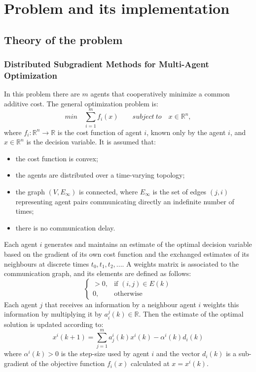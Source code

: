 \documentclass[a4paper,11pt,oneside]{book}
\begin{document}
\chapter{Problem and its implementation} \label{Cap1}

\section{Theory of the problem} \label{Sec1.1}
\subsection {Distributed Subgradient Methods for Multi-Agent Optimization} \label{Subsec1.1.1}
In this problem there are $m$ agents that cooperatively minimize a common additive cost. The general optimization problem is:\\
\begin{equation} \label{costfunct}
min \quad \sum\limits_{i=1}^{m} f_{i} \left( x \right) \qquad subject \ to \quad x \in \mathbb{R}^n,
\end{equation}
where $f_i : \mathbb{R}^n \longrightarrow \mathbb{R}$ is the cost function of agent $i$, known only by the agent $i$, and $x \in \mathbb{R}^n$ is the decision variable. It is assumed that:
\begin{itemize} 
\item the cost function is convex;
\item the agents are distributed over a time-varying topology;
\item the graph $\left(V,E_\infty\right)$ is connected, where $E_\infty$ is the set of edges $\left(j,i\right)$ representing agent pairs communicating directly an indefinite number of times;
\item there is no communication delay.
\end{itemize} 
Each agent $i$ generates and maintains an estimate of the optimal decision variable based on the gradient of its own cost function and the exchanged estimates of its neighbours at discrete times $t_0, t_1, t_2, ...$. A weights matrix is associated to the communication graph, and its elements are defined as follows:
\[
	\begin{cases}
		> 0, & \text{if } (i,j) \in E(k) \\
		0, & \text{otherwise}
	\end{cases}
\]
Each agent $j$ that receives an information by a neighbour agent $i$ weights this information by multiplying it by $a_i^j(k) \in \mathbb{R}$. Then the estimate of the optimal solution is updated according to:
\begin{equation} \label{update}
x^i\left(k+1\right) = \sum_{j=1}^{m}{a_j^i\left(k\right)x^i\left(k\right)-\alpha^i\left(k\right)d_i\left(k\right)}
\end{equation}
where $\alpha^i(k)>0$ is the step-size used by agent $i$ and the vector $d_i(k)$ is a sub-gradient of the objective function $f_i(x)$ calculated at $x=x^i(k)$. \cite{CITATION:1}
\end{document}
